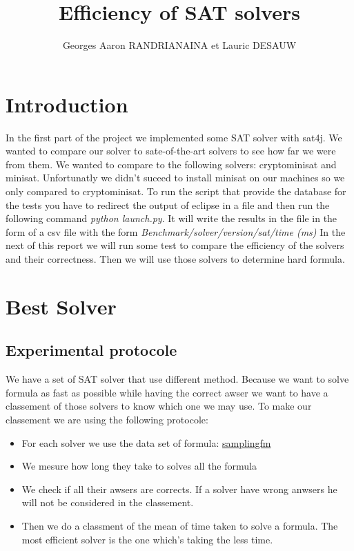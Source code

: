 \documentclass{article}
\title{Efficiency of SAT solvers}
\author{Georges Aaron RANDRIANAINA et Lauric DESAUW}
\begin{document}
\maketitle

\section{Introduction}
In the first part of the project we implemented some SAT solver with sat4j. We wanted to compare our solver to sate-of-the-art solvers to see how far we were from them. 
We wanted to compare to the following solvers: cryptominisat and minisat. Unfortunatly we didn't suceed to install minisat on our machines so we only compared to cryptominisat.
To run the script that provide the database for the tests you have to redirect the output of eclipse in a file and then run the following command \emph{python launch.py}. It will write the results in the file in the form of a csv file with the form \emph{Benchmark/solver/version/sat/time (ms)}
In the next of this report we will run some test to compare the efficiency of the solvers and their correctness. Then we will use those solvers to determine hard formula. 

\section{Best Solver}
\subsection{Experimental protocole}
We have a set of SAT solver that use different method. Because we want to solve formula as fast as possible while having the correct awser we want to have a classement of those solvers to know which one we may use. To make our classement we are using the following protocole:

\vskip 3mm

\begin{itemize}
\item For each solver we use the data set of formula: \href{https://github.com/diverse-project/samplingfm/tree/master/Benchmarks}{samplingfm}
\item We mesure how long they take to solves all the formula
\item We check if all their awsers are corrects. If a solver have wrong anwsers he will not be considered in the classement. 
\item  Then we do a classment of the mean of time taken to solve a formula. The most efficient solver is the one which's taking the less time. 
\end{itemize}
\end{document}
